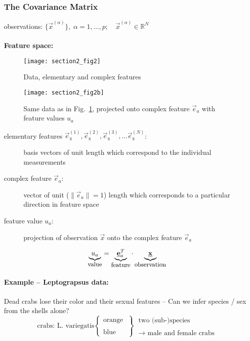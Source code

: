 \subsubsection{The Covariance Matrix}
observations: $\big\{ \vec{x}^{(\alpha)} \big\}, \; \alpha = 1, \ldots, p; \quad \vec{x}^{(\alpha)} \in \mathbb{R}^N$
\\\\
{\bf Feature space:}
\begin{figure}[h]
  \centering
  \texttt{[image: section2\_fig2]}  
  \caption{Data, elementary and complex features}
  \label{fig:features}
\end{figure}
\begin{figure}[h]
  \centering
  \texttt{[image: section2\_fig2b]}  
  \caption{Same data as in Fig.~\ref{fig:features}, projected onto complex feature $\vec{e}_a$ with feature values $u_a$}
  \label{fig:featuresproj}
\end{figure}
\begin{description}
\item[elementary features $\vec{e}_\mathrm{x}^{(1)}, \vec{e}_\mathrm{x}^{(2)}, \vec{e}_\mathrm{x}^{(3)}, \ldots \vec{e}_\mathrm{x}^{(N)}$:] basis vectors of unit length which correspond to the individual measurements
\item[complex feature $\vec{e}_a$:] vector of unit ($\|\vec{e}_a\|=1$) length which
  corresponds to a particular direction in feature space
\item[feature value $u_a$:] projection of observation $\vec{x}$ onto the complex feature $\vec{e}_a$
\end{description}
\begin{equation}
	\underbrace{u_a }_{ \text{{\small value}} }
	= \underbrace{ \vec{e}_a^T }_{ \text{{\small feature}} }
	\cdot \underbrace{ \vec{x} }_{ \text{{\small observation}} }
\end{equation}


\paragraph{Example -- Leptograpsus data:} Dead crabs lose their color and their sexual features -- 
Can we infer species / sex from the shells alone?
\[ \text{crabs: L. variegatis} \left\{ \begin{array}{l}
		\text{orange} \\\\
		\text{blue}
	\end{array} \right. \left\} \begin{array}{l}
		\text{two (sub-)species} \\\\
		\rightarrow \text{ male and female crabs}
	\end{array} \right.
\] 

